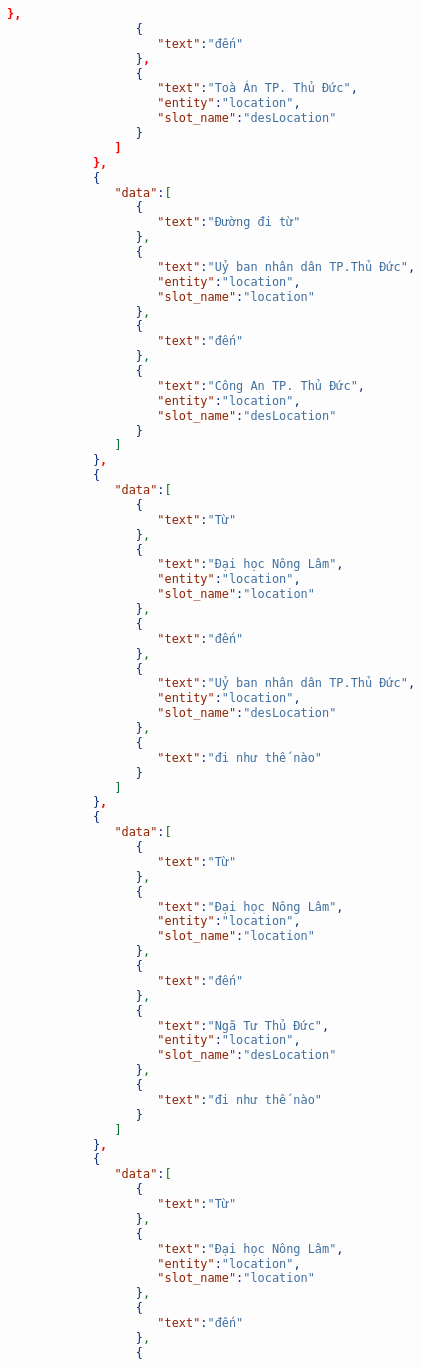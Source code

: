 \begin{lstlisting}[language=json,firstnumber=1]
                  },
                  {
                     "text":"đến"
                  },
                  {
                     "text":"Toà Án TP. Thủ Đức",
                     "entity":"location",
                     "slot_name":"desLocation"
                  }
               ]
            },
            {
               "data":[
                  {
                     "text":"Đường đi từ"
                  },
                  {
                     "text":"Uỷ ban nhân dân TP.Thủ Đức",
                     "entity":"location",
                     "slot_name":"location"
                  },
                  {
                     "text":"đến"
                  },
                  {
                     "text":"Công An TP. Thủ Đức",
                     "entity":"location",
                     "slot_name":"desLocation"
                  }
               ]
            },
            {
               "data":[
                  {
                     "text":"Từ"
                  },
                  {
                     "text":"Đại học Nông Lâm",
                     "entity":"location",
                     "slot_name":"location"
                  },
                  {
                     "text":"đến"
                  },
                  {
                     "text":"Uỷ ban nhân dân TP.Thủ Đức",
                     "entity":"location",
                     "slot_name":"desLocation"
                  },
                  {
                     "text":"đi như thế nào"
                  }
               ]
            },
            {
               "data":[
                  {
                     "text":"Từ"
                  },
                  {
                     "text":"Đại học Nông Lâm",
                     "entity":"location",
                     "slot_name":"location"
                  },
                  {
                     "text":"đến"
                  },
                  {
                     "text":"Ngã Tư Thủ Đức",
                     "entity":"location",
                     "slot_name":"desLocation"
                  },
                  {
                     "text":"đi như thế nào"
                  }
               ]
            },
            {
               "data":[
                  {
                     "text":"Từ"
                  },
                  {
                     "text":"Đại học Nông Lâm",
                     "entity":"location",
                     "slot_name":"location"
                  },
                  {
                     "text":"đến"
                  },
                  {

\end{lstlisting}
